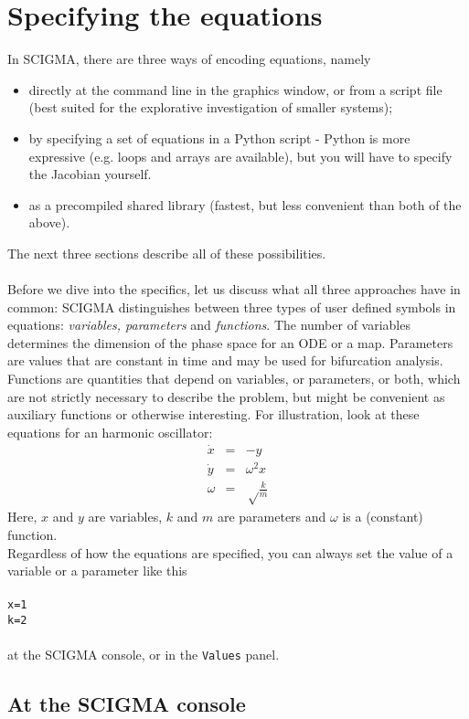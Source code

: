\documentclass[10pt,a4paper,titlepage]{article}
\newcommand{\T}[1]{\texttt{#1}}
\newcommand{\C}[1]{\\\\\T{#1}\\\\}
\begin{document}
 \newpage\section{Specifying the equations}
 \label{sec::eq}
In SCIGMA, there are three ways of encoding equations, namely
\begin{itemize}
\item directly at the command line in the graphics window, or from a script file (best suited for the explorative investigation of smaller systems);
\item by specifying a set of equations in a Python script - Python is more expressive (e.g. loops and arrays
	are available), but you will have to specify the Jacobian yourself. 
\item	as a precompiled shared library (fastest, but less convenient than both of the above).
\end{itemize}
The next three sections describe all of these possibilities.\\\\
Before we dive into the specifics, let us discuss what all three approaches have in common: SCIGMA distinguishes between three types of user defined symbols in equations: \emph{variables, parameters} and \emph{functions}. The number of variables determines the dimension of the phase space for an ODE or a map. Parameters are values that are constant in time and may be used for bifurcation analysis. Functions are quantities that depend on variables, or parameters, or both, which are not strictly necessary to describe the problem, but might be convenient as auxiliary functions or otherwise interesting. For illustration, look at these equations for an harmonic oscillator:
\begin{eqnarray}
\dot{x}&=&-y\nonumber\\ 
\dot{y}&=&\omega^2x\nonumber\\
\omega&=&\sqrt\frac{k}{m}
\label{example}
\end{eqnarray}
Here, $x$ and $y$ are variables, $k$ and $m$ are parameters and $\omega$ is a (constant) function.\\
Regardless of how the equations are specified, you can always set the value of a variable or a parameter like this
\C{x=1\\k=2}
at the SCIGMA console, or in the \T{Values} panel.

\subsection{At the SCIGMA console}
\label{sec::internaleq}
\end{document}
